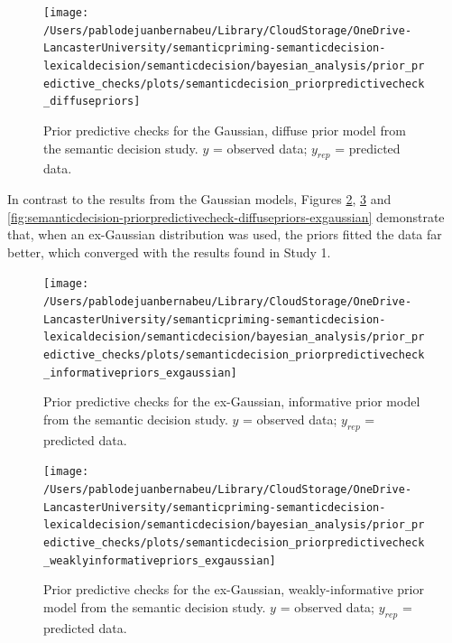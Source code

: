 \documentclass[
  12pt,
  man,floatsintext]{apa7}
\begin{document}
\begin{figure}

{\centering \texttt{[image: /Users/pablodejuanbernabeu/Library/CloudStorage/OneDrive-LancasterUniversity/semanticpriming-semanticdecision-lexicaldecision/semanticdecision/bayesian\_analysis/prior\_predictive\_checks/plots/semanticdecision\_priorpredictivecheck\_diffusepriors]} 

}

\caption{Prior predictive checks for the Gaussian, diffuse prior model from the semantic decision study. \(y\) = observed data; \(y_{rep}\) = predicted data.}\label{fig:semanticdecision-priorpredictivecheck-diffusepriors}
\end{figure}

In contrast to the results from the Gaussian models, Figures \ref{fig:semanticdecision-priorpredictivecheck-informativepriors-exgaussian}, \ref{fig:semanticdecision-priorpredictivecheck-weaklyinformativepriors-exgaussian} and \ref{fig:semanticdecision-priorpredictivecheck-diffusepriors-exgaussian} demonstrate that, when an ex-Gaussian distribution was used, the priors fitted the data far better, which converged with the results found in Study 1.



\begin{figure}

{\centering \texttt{[image: /Users/pablodejuanbernabeu/Library/CloudStorage/OneDrive-LancasterUniversity/semanticpriming-semanticdecision-lexicaldecision/semanticdecision/bayesian\_analysis/prior\_predictive\_checks/plots/semanticdecision\_priorpredictivecheck\_informativepriors\_exgaussian]} 

}

\caption{Prior predictive checks for the ex-Gaussian, informative prior model from the semantic decision study. \(y\) = observed data; \(y_{rep}\) = predicted data.}\label{fig:semanticdecision-priorpredictivecheck-informativepriors-exgaussian}
\end{figure}



\begin{figure}

{\centering \texttt{[image: /Users/pablodejuanbernabeu/Library/CloudStorage/OneDrive-LancasterUniversity/semanticpriming-semanticdecision-lexicaldecision/semanticdecision/bayesian\_analysis/prior\_predictive\_checks/plots/semanticdecision\_priorpredictivecheck\_weaklyinformativepriors\_exgaussian]} 

}

\caption{Prior predictive checks for the ex-Gaussian, weakly-informative prior model from the semantic decision study. \(y\) = observed data; \(y_{rep}\) = predicted data.}\label{fig:semanticdecision-priorpredictivecheck-weaklyinformativepriors-exgaussian}
\end{figure}
\end{document}
